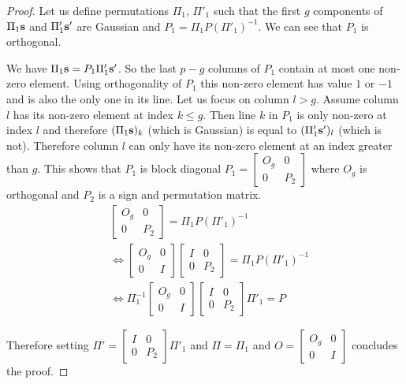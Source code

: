 \documentclass{report}
\begin{document}
{\begin{proof}
  Let us define permutations $\Pi_1$, $\Pi'_1$ such that the first $g$ components of $\Pi_1 \mathbf{s}$ and $\Pi'_1 \mathbf{s}'$ are Gaussian and $P_1  = \Pi_1 P (\Pi'_1)^{-1}$. We can see that $P_1$ is orthogonal.
  
  We have $\Pi_1 \mathbf{s} = P_1 \Pi'_1 \mathbf{s}'$. So the last $p-g$ columns of $P_1$ contain at most one non-zero element. Using orthogonality of $P_1$ this non-zero element has value $1$ or $-1$ and is also the only one in its line. Let us focus on column $l > g$. Assume column $l$ has its non-zero element at index $k \leq g$. Then line $k$ in $P_1$ is only non-zero at index $l$ and therefore $(\Pi_1 \mathbf{s})_k$ (which is Gaussian) is equal to $(\Pi'_1 \mathbf{s}')_l$ (which is not). Therefore column $l$ can only have its non-zero element at an index greater than $g$. This shows that $P_1$ is block diagonal $P_1 = \begin{bmatrix} O_g & 0 \\ 0 & P_2 \end{bmatrix}$ where $O_g$ is orthogonal  and $P_2$ is a sign and permutation matrix.
  \begin{align}
      &\begin{bmatrix} O_g & 0 \\ 0 & P_2 \end{bmatrix} = \Pi_1 P (\Pi'_1)^{-1} \\
      & \iff \begin{bmatrix} O_g & 0 \\ 0 & I \end{bmatrix} \begin{bmatrix} I & 0 \\ 0 & P_2 \end{bmatrix}  = \Pi_1 P (\Pi'_1)^{-1} \\
      & \iff \Pi_1^{-1} \begin{bmatrix} O_g & 0 \\ 0 & I \end{bmatrix} \begin{bmatrix} I & 0 \\ 0 & P_2 \end{bmatrix} \Pi'_1  = P
  \end{align}
  
  Therefore setting $\Pi' =   \begin{bmatrix} I & 0 \\ 0 & P_2 \end{bmatrix} \Pi'_1$ and $\Pi = \Pi_1$ and $O= \begin{bmatrix}O_g & 0 \\ 0 & I  \end{bmatrix}$ concludes the proof.
  

\end{proof}}
\end{document}
